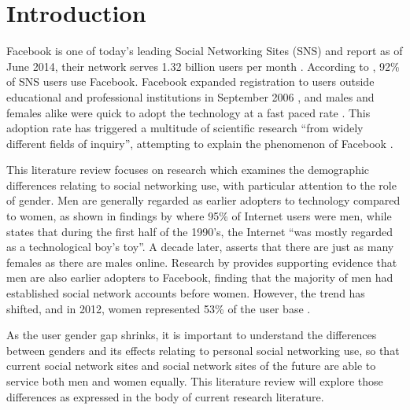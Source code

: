 \section{Introduction}

Facebook is one of today's leading Social Networking Sites (SNS) and report as of June 2014, their network serves 1.32 billion users per month \citep{Facebook2014}. According to \citet{Hampton2011}, 92\% of SNS users use Facebook. Facebook expanded registration to users outside educational and professional institutions in September 2006 \citep{Facebook2014}, and males and females alike were quick to adopt the technology at a fast paced rate \citep{Mazman2011}. This adoption rate has triggered a multitude of scientific research ``from widely different fields of inquiry'', attempting to explain the phenomenon of Facebook \citep[p. 983]{Caers2013}.

This literature review focuses on research which examines the demographic differences relating to social networking use, with particular attention to the role of gender. Men are generally regarded as earlier adopters to technology compared to women, as shown in findings by \citet{Pitkow1994} where 95\% of Internet users were men, while \citet[p. 896]{Kimbrough2013} states that during the first half of the 1990's, the Internet ``was mostly regarded as a technological boy's toy''. A decade later, \citet{Fallows2005} asserts that there are just as many females as there are males online. Research by \citet{Fogel2009} provides supporting evidence that men are also earlier adopters to Facebook, finding that the majority of men had established social network accounts before women. However, the trend has shifted, and in 2012, women represented 53\% of the user base \citep{Duggan2013}.

As the user gender gap shrinks, it is important to understand the differences between genders and its effects relating to personal social networking use, so that current social network sites and social network sites of the future are able to service both men and women equally. This literature review will explore those differences as expressed in the body of current research literature.